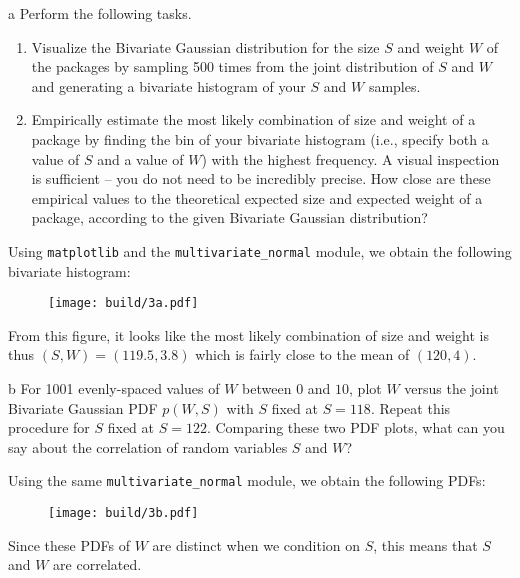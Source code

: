 \documentclass[expanded]{pset}
\begin{document}
\begin{parts}
  \begin{part}{a}
    Perform the following tasks.

    \begin{enumerate}
        \item Visualize the Bivariate Gaussian distribution for the size $S$ and weight $W$ of the packages by sampling 500 times from the joint distribution of $S$ and $W$ and generating a bivariate histogram of your $S$ and $W$ samples.
        \item Empirically estimate the most likely combination of size and weight of a package by finding the bin of your bivariate histogram (i.e., specify both a value of $S$ and a value of $W$) with the highest frequency. A visual inspection is sufficient -- you do not need to be incredibly precise.  How close are these empirical values to the theoretical expected size and expected weight of a package, according to the given Bivariate Gaussian distribution?
    \end{enumerate}
  \end{part}

  Using \texttt{matplotlib} and the \texttt{multivariate\_normal} module, we obtain the following bivariate histogram:

  \begin{figure}[ht]
    \centering
    \texttt{[image: build/3a.pdf]}
  \end{figure}\noindent
  From this figure, it looks like the most likely combination of size and weight is thus $(S,W)=(119.5, 3.8)$ which is fairly close to the mean of $(120, 4)$.

  \begin{part}{b}
     For 1001 evenly-spaced values of $W$ between $0$ and $10$, plot $W$ versus the joint Bivariate Gaussian PDF $p(W, S)$ with $S$ fixed at $S=118$. Repeat this procedure for $S$ fixed at $S=122$. Comparing these two PDF plots, what can you say about the correlation of random variables $S$ and $W$?
  \end{part}

  Using the same \texttt{multivariate\_normal} module, we obtain the following PDFs:

  \begin{figure}[ht]
    \centering
    \texttt{[image: build/3b.pdf]}
  \end{figure}\noindent
  Since these PDFs of $W$ are distinct when we condition on $S$, this means that $S$ and $W$ are correlated.


\end{parts}
\end{document}
